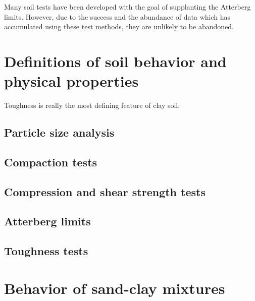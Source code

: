 \documentclass[
]{book}
\begin{document}
Many soil tests have been developed with the goal of supplanting the Atterberg limits. However, due to the success and the abundance of data which has accumulated using these test methods, they are unlikely to be abandoned.

\hypertarget{definitions-of-soil-behavior-and-physical-properties}{%
\section{Definitions of soil behavior and physical properties}\label{definitions-of-soil-behavior-and-physical-properties}}

Toughness is really the most defining feature of clay soil.

\hypertarget{particle-size-analysis}{%
\subsection{Particle size analysis}\label{particle-size-analysis}}

\hypertarget{compaction-tests}{%
\subsection{Compaction tests}\label{compaction-tests}}

\hypertarget{compression-and-shear-strength-tests}{%
\subsection{Compression and shear strength tests}\label{compression-and-shear-strength-tests}}

\hypertarget{atterberg-limits}{%
\subsection{Atterberg limits}\label{atterberg-limits}}

\hypertarget{toughness-tests}{%
\subsection{Toughness tests}\label{toughness-tests}}

\hypertarget{behavior-of-sand-clay-mixtures}{%
\section{Behavior of sand-clay mixtures}\label{behavior-of-sand-clay-mixtures}}
\end{document}
